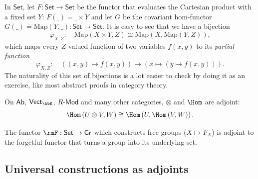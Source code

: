\begin{example}
In $\mathsf{Set}$, let $F:\mathsf{Set}\to\mathsf{Set}$ be the functor
that evaluates the Cartesian product with a fixed set $Y$: $F\left(\_\right)=\_\times Y$
and let $G$ be the covariant hom-functor $G\left(\_\right)=\mathrm{Map}\left(Y,\_\right):\mathsf{Set}\to\mathsf{Set}$.
It is easy to see that we have a bijection
\[
\varphi_{X,Z}:\quad\mathrm{Map}\left(X\times Y,Z\right)\cong\mathrm{Map}\left(X,\mathrm{Map}\left(Y,Z\right)\right),
\]
which maps every $Z$-valued function of two variables $f(x,y)$ to
its \emph{partial function}
\[
\varphi_{X,Z}:\quad\left(\left(x,y\right)\mapsto f(x,y)\right)\mapsto\left(x\mapsto\left(y\mapsto f\left(x,y\right)\right)\right).
\]
The naturality of this set of bijections is a lot easier to check
by doing it as an exercise, like most abstract proofs in category
theory.
\end{example}
%
\begin{example}\label{hom-functor adjoint}
On $\mathsf{Ab}$, $\mathsf{Vect}_{\bbK}$, $R\text{-}\mathsf{Mod}$
and many other categories, $\otimes$ and $\Hom$ are adjoint:
\[
\Hom\left(U\otimes V,W\right)\cong\Hom\left(U,\Hom\left(V,W\right)\right).
\]
\end{example}
%
\begin{example}
The functor $\rmF:\mathsf{Set}\to \mathsf{Gr}$ which constructs free groups ($X\mapsto F_X$) is adjoint to the forgetful functor that turns a group into its underlying set.
\end{example}




\subsection{Universal constructions as adjoints}


